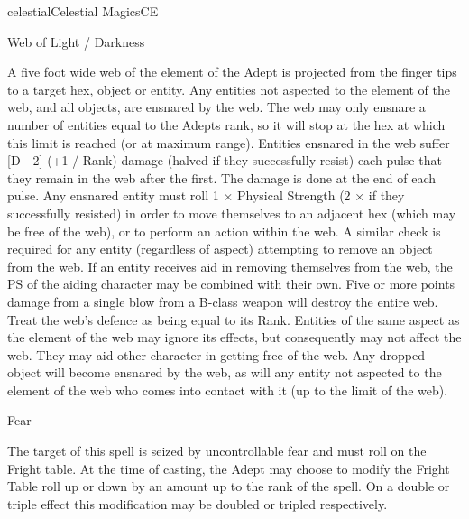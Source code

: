 \begin{College}[1.3]{celestial}{Celestial Magics}{CE}
\begin{spell}[S-6]{Web of Light / Darkness}
\begin{effects}
A five foot wide web of the element of the Adept is projected from the
finger tips to a target hex, object or entity.  Any entities not
aspected to the element of the web, and all objects, are ensnared by
the web.  The web may only ensnare a number of entities equal to the
Adepts rank, so it will stop at the hex at which this limit is reached
(or at maximum range).  Entities ensnared in the web suffer [D - 2]
(+1 / Rank) damage (halved if they successfully resist) each pulse
that they remain in the web after the first. The damage is done at the
end of each pulse. Any ensnared entity must roll 1 × Physical Strength
(2 × if they successfully resisted) in order to move themselves to an
adjacent hex (which may be free of the web), or to perform an action
within the web. A similar check is required for any entity (regardless
of aspect) attempting to remove an object from the web. If an entity
receives aid in removing themselves from the web, the PS of the aiding
character may be combined with their own.  Five or more points damage
from a single blow from a B-class weapon will destroy the entire web.
Treat the web’s defence as being equal to its Rank.  Entities of the
same aspect as the element of the web may ignore its effects, but
consequently may not affect the web.  They may aid other character in
getting free of the web.  Any dropped object will become ensnared by
the web, as will any entity not aspected to the element of the web who
comes into contact with it (up to the limit of the web).
\end{effects}
\end{spell}

\begin{spell}[S-7]{Fear }

\begin{effects}
The target of this spell is seized by uncontrollable fear and must
roll on the Fright table.  At the time of casting, the Adept may
choose to modify the Fright Table roll up or down by an amount up to
the rank of the spell.  On a double or triple effect this modification
may be doubled or tripled respectively.
\end{effects}
\end{spell}


\end{College}

